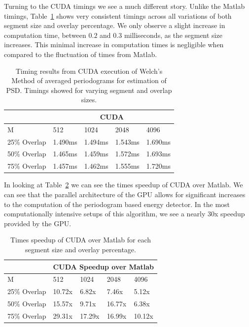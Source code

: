 Turning to the CUDA timings we see a much different story.  Unlike the Matlab timings, Table~\ref{tbl:pwelch_cuda_timings} shows very consistent timings across all variations of both segment size and overlay percentage.  We only observe a slight increase in computation time, between $0.2$ and $0.3$ milliseconds, as the segment size increases.  This minimal increase in computation times is negligible when compared to the fluctuation of times from Matlab.

\begin{table}
\begin{center}
\begin{tabular}{|l|l|l|l|l|}
\hline
 & \multicolumn{4}{|c|}{CUDA} \\
\hline
M & 512 & 1024 & 2048 & 4096 \\
\hline
25\% Overlap & 1.490ms & 1.494ms & 1.543ms & 1.690ms \\
50\% Overlap & 1.465ms & 1.459ms & 1.572ms & 1.693ms \\
75\% Overlap & 1.457ms & 1.462ms & 1.555ms & 1.720ms \\
\hline
\end{tabular}
\vspace{0.5cm}
\caption{Timing results from CUDA execution of Welch's Method of averaged periodograms for estimation of PSD.  Timings showed for varying segment and overlap sizes.}
\label{tbl:pwelch_cuda_timings}
\end{center}
\end{table}

In looking at Table~\ref{tbl:pwelch_cuda_speedup} we can see the times speedup of CUDA over Matlab.  We can see that the parallel architecture of the GPU allows for significant increases to the computation of the periodogram based energy detector.  In the most computationally intensive setups of this algorithm, we see a nearly 30x speedup provided by the GPU.

\begin{table}
\begin{center}
\begin{tabular}{|l|l|l|l|l|}
\hline
 & \multicolumn{4}{|c|}{CUDA Speedup over Matlab} \\
\hline
M & 512 & 1024 & 2048 & 4096 \\
\hline
25\% Overlap & 10.72x & 6.82x & 7.46x & 5.12x \\
50\% Overlap & 15.57x & 9.71x & 16.77x & 6.38x \\
75\% Overlap & 29.31x & 17.29x & 16.99x & 10.12x \\
\hline
\end{tabular}
\vspace{0.5cm}
\caption{Times speedup of CUDA over Matlab for each segment size and overlay percentage.}
\label{tbl:pwelch_cuda_speedup}
\end{center}
\end{table}


